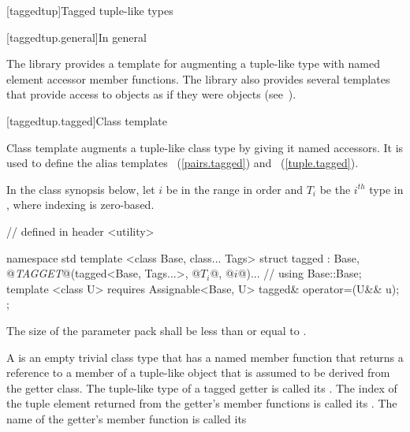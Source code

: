 {\color{newclr}
[taggedtup]{Tagged tuple-like types}

[taggedtup.general]{In general}

\pnum The library provides a template for augmenting a tuple-like type with named element accessor
member functions. The library also provides several templates that provide access to 
objects as if they were  objects (see~).


[taggedtup.tagged]{Class template }

Class template  augments a tuple-like class type by giving it named accessors. It is
used to define the alias templates ~(\ref{pairs.tagged}) and
~(\ref{tuple.tagged}).

\pnum In the class synopsis below, let $i$ be in the range
 in order and $T_i$ be the $i^{th}$ type in , where indexing
is zero-based.

%
\begin{codeblock}
// defined in header <utility>

namespace std {
  template <class Base, class... Tags>
  struct tagged :
    Base, @\textit{TAGGET}@(tagged<Base, Tags...>, @$T_i$@, @$i$@)... { // \seebelow
    using Base::Base;
    template <class U>
      requires Assignable<Base, U>
    tagged& operator=(U&& u);
  };
}
\end{codeblock}

\pnum The size of the  parameter pack shall be less than or equal to
.

\pnum A  is an empty trivial class type that has a named member function that
returns a reference to a member of a tuple-like object that is assumed to be derived from the getter
class. The tuple-like type of a tagged getter is called its .
The index of the tuple element returned from the getter's member functions is called its
. The name of the getter's member function is called its

}
